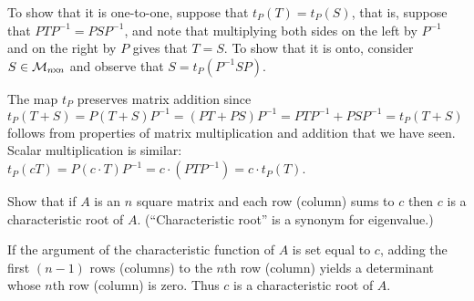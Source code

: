 \begin{exercises}
\begin{answer}
      To show that it is one-to-one, suppose that $t_P(T)=t_P(S)$,
      that is, suppose that $PTP^{-1}=PSP^{-1}$, and note that multiplying
      both sides on the left by $P^{-1}$ and on the right by $P$ gives that
      $T=S$.
      To show that it is onto, consider $S\in\mathcal{M}_{n \! \times \! n}$ and observe
      that $S=t_P(P^{-1}SP)$.

      The map $t_P$ preserves matrix addition since
      $t_P(T+S)=P(T+S)P^{-1}=(PT+PS)P^{-1}=PTP^{-1}+PSP^{-1}=t_P(T+S)$
      follows from properties of matrix multiplication and addition that 
      we have seen.
      Scalar multiplication is 
      similar:~$t_P(cT)=P(c\cdot T)P^{-1}=c\cdot (PTP^{-1})=c\cdot t_P(T)$.
    \end{answer}
  \puzzle \item 
    \cite{MathMag67p232}
    Show that if \( A \) is an \( n \) square matrix and each row (column)
    sums to \( c \) then \( c \) is a characteristic root of \( A \).
    (``Characteristic root'' is a synonym for eigenvalue.)
    \begin{answer}
      \answerasgiven %
      If the argument of the characteristic function of \( A \) is set equal to
      \( c \), adding the first \( (n-1) \) rows (columns) to the
      \( n \)th row (column) yields a determinant whose \( n \)th row
      (column) is zero.
      Thus \( c \) is a characteristic root of \( A \).  
    \end{answer}
\end{exercises}
